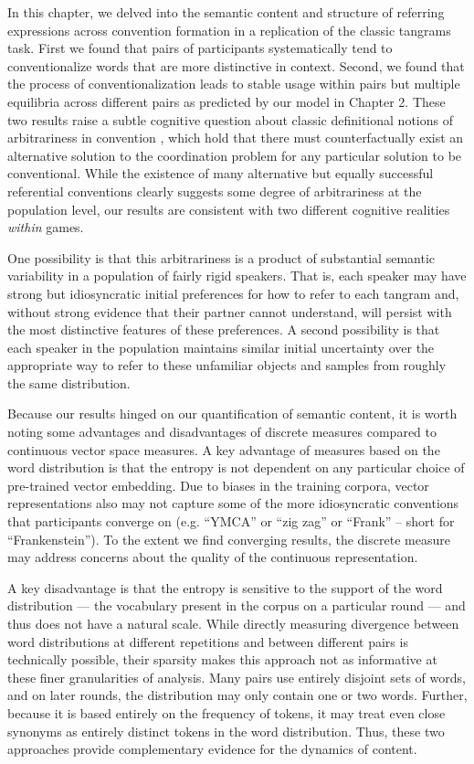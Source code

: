 In this chapter, we delved into the semantic content and structure of referring expressions across convention formation in a replication of the classic tangrams task.
First we found that pairs of participants systematically tend to conventionalize words that are more distinctive in context. 
Second, we found that the process of conventionalization leads to stable usage within pairs but multiple equilibria across different pairs as predicted by our model in Chapter 2.
These two results raise a subtle cognitive question about classic definitional notions of arbitrariness in convention \cite{Lewis69_Convention}, which hold that there must counterfactually exist an alternative solution to the coordination problem for any particular solution to be conventional.
While the existence of many alternative but equally successful referential conventions clearly suggests some degree of arbitrariness at the population level, our results are consistent with two different cognitive realities \emph{within} games.

One possibility is that this arbitrariness is a product of substantial semantic variability in a population of fairly rigid speakers.
That is, each speaker may have strong but idiosyncratic initial preferences for how to refer to each tangram and, without strong evidence that their partner cannot understand, will persist with the most distinctive features of these preferences.
A second possibility is that each speaker in the population maintains similar initial uncertainty over the appropriate way to refer to these unfamiliar objects and samples from roughly the same distribution.

Because our results hinged on our quantification of semantic content, it is worth noting some advantages and disadvantages of discrete measures compared to continuous vector space measures.
A key advantage of measures based on the word distribution is that the entropy is not dependent on any particular choice of pre-trained vector embedding. 
Due to biases in the training corpora, vector representations also may not capture some of the more idiosyncratic conventions that participants converge on (e.g. ``YMCA'' or ``zig zag'' or ``Frank'' -- short for ``Frankenstein'').
To the extent we find converging results, the discrete measure may address concerns about the quality of the continuous representation.

A key disadvantage is that the entropy is sensitive to the support of the word distribution --- the vocabulary present in the corpus on a particular round --- and thus does not have a natural scale.
While directly measuring divergence between word distributions at different repetitions and between different pairs is technically possible, their sparsity makes this approach not as informative at these finer granularities of analysis.
Many pairs use entirely disjoint sets of words, and on later rounds, the distribution may only contain one or two words. 
Further, because it is based entirely on the frequency of tokens, it may treat even close synonyms as entirely distinct tokens in the word distribution. 
Thus, these two approaches provide complementary evidence for the dynamics of content.

